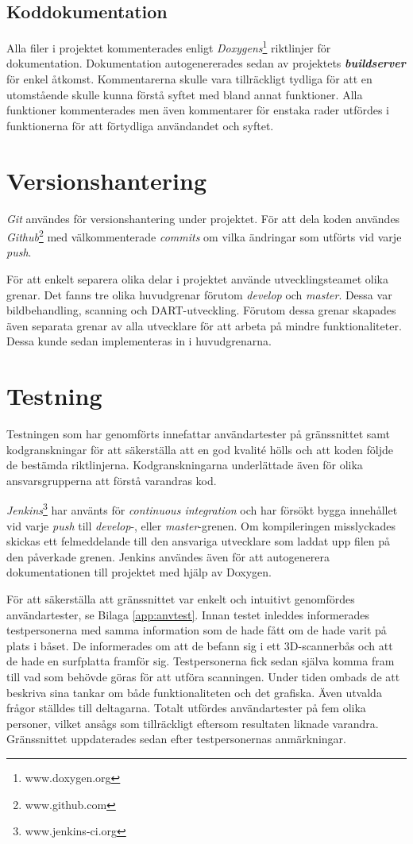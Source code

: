 \documentclass[a4paper,12pt,oneside,final]{extbook}
\begin{document}
\subsection{Koddokumentation}
Alla filer i projektet kommenterades enligt \emph{Doxygens}\footnote{www.doxygen.org} riktlinjer för dokumentation. Dokumentation autogenererades sedan av projektets \textbf{\emph{buildserver}} för enkel åtkomst. Kommentarerna skulle vara tillräckligt tydliga för att en utomstående skulle kunna förstå syftet med bland annat funktioner. Alla funktioner kommenterades men även kommentarer för enstaka rader utfördes i funktionerna för att förtydliga användandet och syftet.

\section{Versionshantering}
\emph{Git} användes för versionshantering under projektet. För att dela koden användes \emph{Github}\footnote{www.github.com}  med välkommenterade \emph{commits} om vilka ändringar som utförts vid varje \emph{push}.

För att enkelt separera olika delar i projektet använde utvecklingsteamet olika grenar. Det fanns tre olika huvudgrenar förutom \emph{develop} och \emph{master}. Dessa var bildbehandling, scanning och DART-utveckling. Förutom dessa grenar skapades även separata grenar av alla utvecklare för att arbeta på mindre funktionaliteter. Dessa kunde sedan implementeras in i huvudgrenarna.

\section{Testning}
Testningen som har genomförts innefattar användartester på gränssnittet samt kodgranskningar för att säkerställa att en god kvalité hölls och att koden följde de bestämda riktlinjerna. Kodgranskningarna underlättade även för olika ansvarsgrupperna att förstå varandras kod.

\emph{Jenkins}\footnote{www.jenkins-ci.org} har använts för \emph{continuous integration} och har försökt bygga innehållet vid varje \emph{push} till \emph{develop}-, eller \emph{master}-grenen. Om kompileringen misslyckades skickas ett felmeddelande till den ansvariga utvecklare som laddat upp filen på den påverkade grenen. Jenkins användes även för att autogenerera dokumentationen till projektet med hjälp av Doxygen.

För att säkerställa att gränssnittet var enkelt och intuitivt genomfördes användartester, se Bilaga \ref{app:anvtest}. Innan testet inleddes informerades testpersonerna med samma information som de hade fått om de hade varit på plats i båset. De informerades om att de befann sig i ett 3D-scannerbås och att de hade en surfplatta framför sig. Testpersonerna fick sedan själva komma fram till vad som behövde göras för att utföra scanningen. Under tiden ombads de att beskriva sina tankar om både funktionaliteten och det grafiska. Även utvalda frågor ställdes till deltagarna. Totalt utfördes användartester på fem olika personer, vilket ansågs som tillräckligt eftersom resultaten liknade varandra. Gränssnittet uppdaterades sedan efter testpersonernas anmärkningar.
\end{document}
